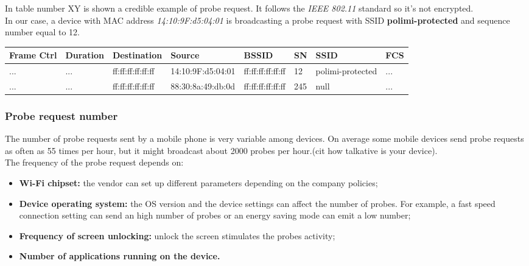 In table number XY is shown a credible example of probe request. It follows the \textit{IEEE 802.11} standard so it's not encrypted.\\
In our case, a device with MAC address \textit{14:10:9F:d5:04:01} is broadcasting a probe request with SSID \textbf{polimi-protected} and sequence number equal to 12.

\begin{tabularx}{\textwidth}{|l|l|l|l|l|l|l|l|}
\hline
 Frame Ctrl & Duration & Destination &Source & BSSID & SN & SSID& FCS \\ \hline
... & ... & ff:ff:ff:ff:ff:ff  & 14:10:9F:d5:04:01 & ff:ff:ff:ff:ff:ff& 12 & polimi-protected & ... \\
... & ... & ff:ff:ff:ff:ff:ff  & 88:30:8a:49:db:0d & ff:ff:ff:ff:ff:ff& 245 & null & ... \\ \hline
\end{tabularx}

\subsubsection{Probe request number}
The number of probe requests sent by a mobile phone is very variable among devices. On average some mobile devices send probe requests as often as 55 times per hour, but it might broadcast about 2000 probes per hour.(cit how talkative is your device).\\
The frequency of the probe request depends on:
\begin{itemize}
\item \textbf{Wi-Fi chipset:} the vendor can set up different parameters depending on the company policies;
\item \textbf{Device operating system:} the OS version and the device settings can affect the number of probes. For example, a fast speed connection setting can send an high number of probes or an energy saving mode can emit a low number;
\item \textbf{Frequency of screen unlocking:} unlock the screen stimulates the probes activity;
\item \textbf{Number of applications running on the device.}
\end{itemize}

